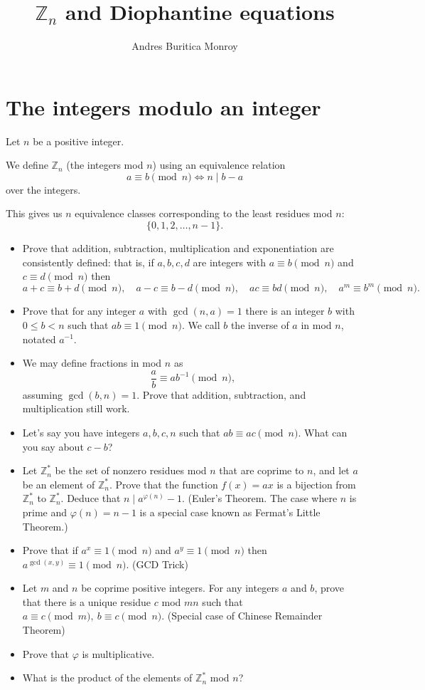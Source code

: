 \documentclass{article}
\title{$\mathbb Z_n$ and Diophantine equations}
\author{Andres Buritica Monroy}
\date{}
\begin{document}
\maketitle
\section{The integers modulo an integer}
Let $n$ be a positive integer.

We define $\mathbb Z_n$ (the integers mod $n$) using an equivalence relation
\[a\equiv b\pmod n\iff n\mid b-a\]
over the integers.

This gives us $n$ equivalence classes corresponding to the least residues mod
$n$: \[\{0,1,2,\ldots,n-1\}.\]
\begin{itemize}
	\item Prove that addition, subtraction, multiplication and exponentiation
	      are consistently defined: that
	      is, if $a,b,c,d$ are integers with $a\equiv b\pmod n$ and $c\equiv d\pmod
		      n$ then \[a+c\equiv b+d\pmod n,\quad a-c\equiv b-d\pmod n,\quad ac\equiv
		      bd\pmod n,\quad a^m\equiv b^m\pmod n.\]
	\item Prove that for any integer $a$ with $\gcd(n,a)=1$ there is an integer $b$
	      with $0\le b<n$ such that $ab\equiv 1\pmod n$. We call $b$ the inverse of
	      $a$ in mod $n$, notated $a^{-1}$.
	\item We may define fractions in mod $n$ as \[\frac ab\equiv ab^{-1}\pmod n,\]
	      assuming $\gcd(b,n)=1$. Prove that addition, subtraction, and
	      multiplication still work.
	\item Let's say you have integers $a,b,c,n$ such that $ab\equiv ac\pmod n$.
	      What can you say about $c-b$?
	\item Let $\mathbb Z_n^*$ be the set of nonzero residues mod $n$ that are
	      coprime to $n$, and let $a$ be an
	      element of $\mathbb Z_n^*$. Prove that the function $f(x)=ax$ is a
	      bijection from $\mathbb Z_n^*$ to $\mathbb Z_n^*$. Deduce that $n\mid
		      a^{\varphi(n)}-1$. (Euler's Theorem. The case where $n$ is prime and
	      $\varphi(n)=n-1$ is a special case known as Fermat's Little Theorem.)
	\item Prove that if $a^x\equiv 1\pmod n$ and $a^y\equiv 1\pmod n$ then
	      $a^{\gcd(x,y)}\equiv 1\pmod n$. (GCD Trick)
	\item Let $m$ and $n$ be coprime positive integers. For any integers $a$ and
	      $b$, prove that there is a unique residue $c$ mod $mn$ such that $a\equiv
		      c\pmod m,\ b\equiv c\pmod n$. (Special case of Chinese Remainder Theorem)
	\item Prove that $\varphi$ is multiplicative.
	\item What is the product of the elements of $\mathbb Z_n^*$ mod $n$?
\end{itemize}
\newpage
\end{document}
